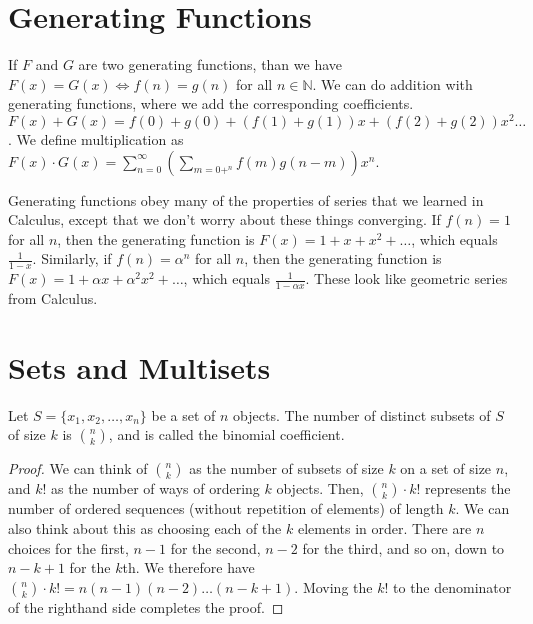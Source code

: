 \section*{Generating Functions}



 If $F$ and $G$ are two generating functions, than we have $F(x) = G(x) \iff f(n)=g(n)$ for all $n\in \mathbb{N}$.  We can do addition with generating functions, where we add the corresponding coefficients.  $F(x)+G(x) = f(0)+g(0) + (f(1)+g(1))x + (f(2)+g(2))x^2 \dots $.  We define multiplication as $F(x)\cdot G(x) = \sum\limits_{n=0}^\infty(\sum\limits_{m=0+^n}f(m)g(n-m))x^n$.  
 
 Generating functions obey many of the properties of series that we learned in Calculus, except that we don't worry about these things converging.  If $f(n)=1$ for all $n$, then the generating function is $F(x)=1+x+x^2+\dots$, which equals $\frac{1}{1-x}$.  Similarly, if $f(n)=\alpha^n$ for all $n$, then the generating function is $F(x)=1+\alpha x + \alpha^2 x^2 +\dots$, which equals $\frac{1}{1-\alpha x}$.  These look like geometric series from Calculus.
 
 
 \section*{Sets and Multisets}
 
 Let $S = \{x_1,x_2,\dots,x_n\}$ be a set of $n$ objects.  The number of distinct subsets of $S$ of size $k$ is $\binom{n}{k}$, and is called the binomial coefficient.
 
 \begin{proof}
 	
 	We can think of $\binom{n}{k}$ as the number of subsets of size $k$ on a set of size $n$, and $k!$ as the number of ways of ordering $k$ objects.  Then, $\binom{n}{k}\cdot k!$ represents the number of ordered sequences (without repetition of elements) of length $k$.  We can also think about this as choosing each of the $k$ elements in order.  There are $n$ choices for the first, $n-1$ for the second, $n-2$ for the third, and so on, down to $n-k+1$ for the $k$th.  We therefore have $\binom{n}{k}\cdot k! = n(n-1)(n-2)\dots (n-k+1)$.  Moving the $k!$ to the denominator of the righthand side completes the proof.
 	
 \end{proof}
 
